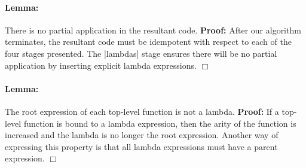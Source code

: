 \documentclass[preprint]{sigplanconf}
\begin{document}
\newenvironment{lemma}[1]
    {\paragraph{Lemma:} #1 \textbf{Proof:} }
    {\hfill$\Box$}

\begin{lemma}{There is no partial application in the resultant code.}
After our algorithm terminates, the resultant code must be idempotent with respect to each of the four stages presented. The |lambdas| stage ensures there will be no partial application by inserting explicit lambda expressions.
\end{lemma}

\begin{lemma}{The root expression of each top-level function is not a lambda.}
If a top-level function is bound to a lambda expression, then the arity of the function is increased and the lambda is no longer the root expression. Another way of expressing this property is that all lambda expressions must have a parent expression.
\end{lemma}
\end{document}
